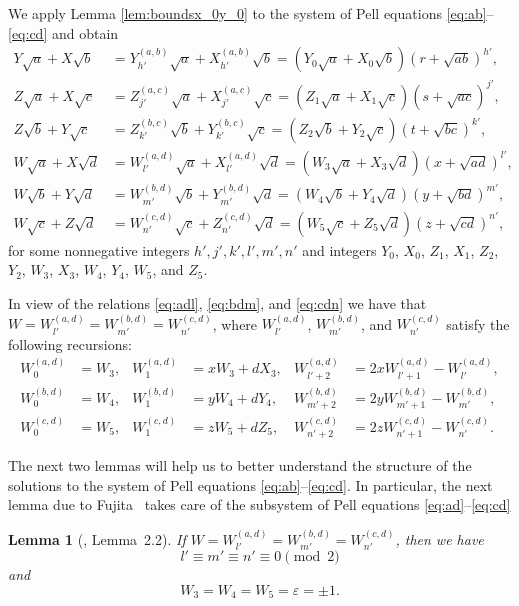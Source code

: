 \documentclass{amsart}
\newtheorem{lemma}{Lemma}
\theoremstyle{definition}
\begin{document}
We apply Lemma \ref{lem:boundsx_0y_0} to the system of Pell equations \eqref{eq:ab}--\eqref{eq:cd} and obtain
\begin{align}\label{eq:abi}
Y \sqrt{a} + X \sqrt{b} &=Y^{(a,b)}_{h'} \sqrt{a} + X^{(a,b)}_{h'} \sqrt{b} = (Y_0 \sqrt{a} + X_0 \sqrt{b})(r+\sqrt{ab})^{h'},\\\label{eq:acj}
Z \sqrt{a} + X \sqrt{c} &=Z^{(a,c)}_{j'} \sqrt{a} + X^{(a,c)}_{j'} \sqrt{c} = (Z_1 \sqrt{a} + X_1 \sqrt{c})(s+\sqrt{ac})^{j'},\\\label{eq:bck}
Z \sqrt{b} + Y \sqrt{c} &=Z^{(b,c)}_{k'} \sqrt{b} + Y^{(b,c)}_{k'} \sqrt{c} = (Z_2 \sqrt{b} + Y_2 \sqrt{c})(t+\sqrt{bc})^{k'},\\\label{eq:adl}
W \sqrt{a} + X \sqrt{d} &=W^{(a,d)}_{l'} \sqrt{a} + X^{(a,d)}_{l'} \sqrt{d} = (W_3 \sqrt{a} + X_3 \sqrt{d})(x+\sqrt{ad})^{l'},\\\label{eq:bdm}
W \sqrt{b} + Y \sqrt{d} &=W^{(b,d)}_{m'} \sqrt{b} + Y^{(b,d)}_{m'} \sqrt{d} = (W_4 \sqrt{b} + Y_4 \sqrt{d})(y+\sqrt{bd})^{m'},\\\label{eq:cdn}
W \sqrt{c} + Z \sqrt{d} &=W^{(c,d)}_{n'} \sqrt{c} + Z^{(c,d)}_{n'} \sqrt{d} = (W_5 \sqrt{c} + Z_5 \sqrt{d})(z+\sqrt{cd})^{n'},
\end{align}
for some nonnegative integers $h',j',k',l',m',n'$ and integers $Y_0$, $X_0$, $Z_1$, $X_1$, $Z_2$, $Y_2$, $W_3$, $X_3$, $W_4$, $Y_4$, $W_5$, and $Z_5$.

In view of the relations \eqref{eq:adl}, \eqref{eq:bdm}, and \eqref{eq:cdn} we have that 
 $W=W^{(a,d)}_{l'} = W^{(b,d)}_{m'}=W^{(c,d)}_{n'}$, where $W^{(a,d)}_{l'}$, $W^{(b,d)}_{m'}$, and $W^{(c,d)}_{n'}$ satisfy the following recursions:
\begin{align*}
W^{(a,d)}_0 &= W_3,& W^{(a,d)}_1 &= xW_3 + d X_3,& W^{(a,d)}_{l'+2} &= 2x W^{(a,d)}_{l'+1} -W^{(a,d)}_{l'}, \\
W^{(b,d)}_0 &= W_4,& W^{(b,d)}_1 &= yW_4 + d Y_4,& W^{(b,d)}_{m'+2} &= 2y W^{(b,d)}_{m'+1} - W^{(b,d)}_{m'},\\ 
W^{(c,d)}_0 &= W_5,& W^{(c,d)}_1 &= zW_5 + d Z_5,& W^{(c,d)}_{n'+2} &= 2z W^{(c,d)}_{n'+1} - W^{(c,d)}_{n'}.
\end{align*}

The next two lemmas will help us to better understand the structure of the solutions to the system of Pell equations
\eqref{eq:ab}--\eqref{eq:cd}. In particular, the next lemma due to Fujita~\cite{Fujita-number} takes care
of the subsystem of Pell equations \eqref{eq:ad}--\eqref{eq:cd}

\begin{lemma}[\cite{Fujita-number}, Lemma~2.2]\label{lem:1}
If $W=W^{(a,d)}_{l'} = W^{(b,d)}_{m'}=W^{(c,d)}_{n'}$, then we have
$$
l'\equiv m'\equiv n'\equiv 0 \pmod 2
$$
 and 
$$
W_3=W_4=W_5=\varepsilon =\pm 1.
$$
\end{lemma}
\end{document}

